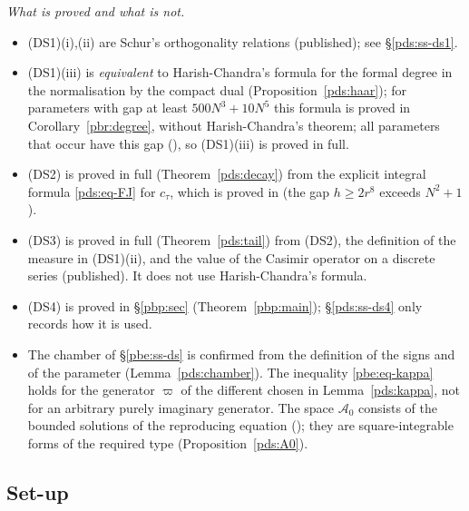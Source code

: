 \documentclass[10pt]{amsart}
\theoremstyle{definition}
\theoremstyle{remark}
\providecommand{\auAz}{\mathcal A_0}
\begin{document}
\emph{What is proved and what is not.}
\begin{itemize}
\item[(1)] \textup{(DS1)(i),(ii)} are Schur's orthogonality relations (published); see
\S\ref{pds:ss-ds1}.
\item[(2)] \textup{(DS1)(iii)} is \emph{equivalent} to Harish-Chandra's formula for the formal degree
in the normalisation by the compact dual (Proposition~\ref{pds:haar}); for parameters with gap at
least $500N^3+10N^5$ this formula is proved in Corollary~\ref{pbr:degree}, without Harish-Chandra's
theorem; all parameters that occur have this gap ({\cite[Proposition~2.19]{P49}}), so (DS1)(iii) is
proved in full.
\item[(3)] \textup{(DS2)} is proved in full (Theorem~\ref{pds:decay}) from the explicit
integral formula \eqref{pds:eq-FJ} for $c_\tau$, which is proved in {\cite[Theorem~3.17]{P49}}
(the gap $h\ge2r^8$ exceeds $N^2+1$).
\item[(4)] \textup{(DS3)} is proved in full (Theorem~\ref{pds:tail}) from \textup{(DS2)}, the
definition of the measure in \textup{(DS1)(ii)}, and the value of the Casimir operator on a discrete
series (published). It does not use Harish-Chandra's formula.
\item[(5)] \textup{(DS4)} is proved in \S\ref{pbp:sec} (Theorem~\ref{pbp:main}); \S\ref{pds:ss-ds4}
only records how it is used.
\item[(6)] The chamber of \S\ref{pbe:ss-ds} is confirmed from the definition of the signs and of the
parameter (Lemma~\ref{pds:chamber}). The inequality \eqref{pbe:eq-kappa} holds for the generator
$\varpi$ of the different chosen in Lemma~\ref{pds:kappa}, not for an arbitrary purely imaginary
generator. The space $\auAz$ consists of the bounded solutions of the reproducing equation
({\cite[\S14.3]{P46}}); they are square-integrable forms of the required type
(Proposition~\ref{pds:A0}).
\end{itemize}

\subsection{Set-up}\label{pds:ss-setup}
\end{document}
